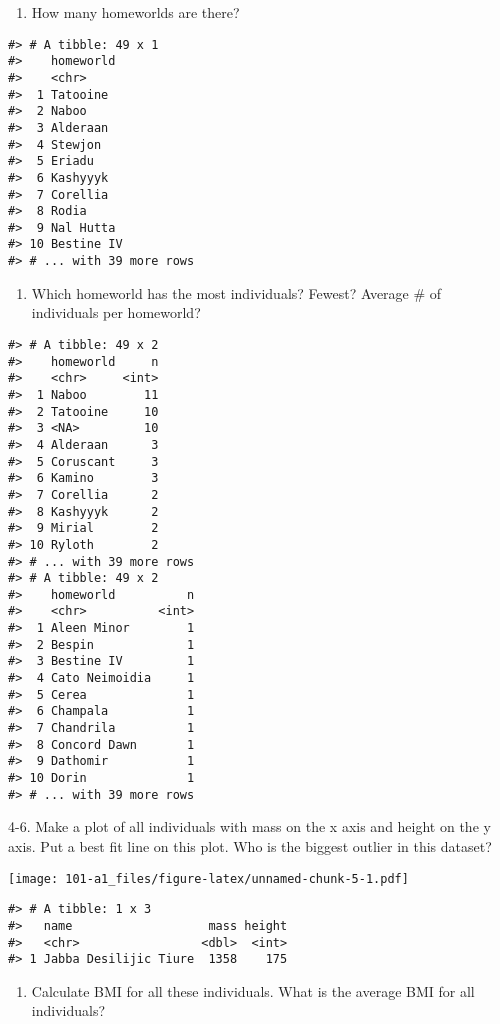 \documentclass[
]{book}
\providecommand{\tightlist}{%
  \setlength{\itemsep}{0pt}\setlength{\parskip}{0pt}}
\begin{document}
\begin{enumerate}
\def\labelenumi{\arabic{enumi}.}
\setcounter{enumi}{1}
\tightlist
\item
  How many homeworlds are there?
\end{enumerate}

\begin{verbatim}
#> # A tibble: 49 x 1
#>    homeworld 
#>    <chr>     
#>  1 Tatooine  
#>  2 Naboo     
#>  3 Alderaan  
#>  4 Stewjon   
#>  5 Eriadu    
#>  6 Kashyyyk  
#>  7 Corellia  
#>  8 Rodia     
#>  9 Nal Hutta 
#> 10 Bestine IV
#> # ... with 39 more rows
\end{verbatim}

\begin{enumerate}
\def\labelenumi{\arabic{enumi}.}
\setcounter{enumi}{2}
\tightlist
\item
  Which homeworld has the most individuals? Fewest? Average \# of individuals per homeworld?
\end{enumerate}

\begin{verbatim}
#> # A tibble: 49 x 2
#>    homeworld     n
#>    <chr>     <int>
#>  1 Naboo        11
#>  2 Tatooine     10
#>  3 <NA>         10
#>  4 Alderaan      3
#>  5 Coruscant     3
#>  6 Kamino        3
#>  7 Corellia      2
#>  8 Kashyyyk      2
#>  9 Mirial        2
#> 10 Ryloth        2
#> # ... with 39 more rows
#> # A tibble: 49 x 2
#>    homeworld          n
#>    <chr>          <int>
#>  1 Aleen Minor        1
#>  2 Bespin             1
#>  3 Bestine IV         1
#>  4 Cato Neimoidia     1
#>  5 Cerea              1
#>  6 Champala           1
#>  7 Chandrila          1
#>  8 Concord Dawn       1
#>  9 Dathomir           1
#> 10 Dorin              1
#> # ... with 39 more rows
\end{verbatim}

4-6. Make a plot of all individuals with mass on the x axis and height on the y axis. Put a best fit line on this plot. Who is the biggest outlier in this dataset?

\texttt{[image: 101-a1\_files/figure-latex/unnamed-chunk-5-1.pdf]}

\begin{verbatim}
#> # A tibble: 1 x 3
#>   name                   mass height
#>   <chr>                 <dbl>  <int>
#> 1 Jabba Desilijic Tiure  1358    175
\end{verbatim}

\begin{enumerate}
\def\labelenumi{\arabic{enumi}.}
\setcounter{enumi}{6}
\tightlist
\item
  Calculate BMI for all these individuals. What is the average BMI for all individuals?
\end{enumerate}
\end{document}
